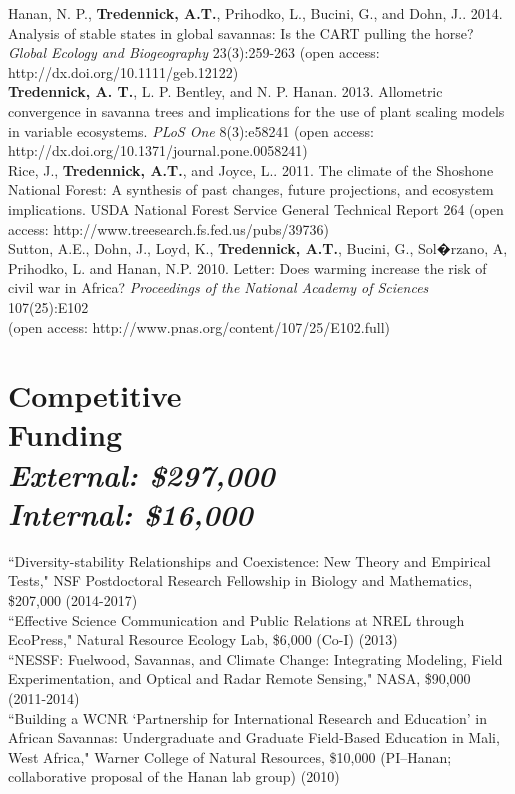 \documentclass[margin,line]{resume}
\begin{document}
\begin{resume}
	Hanan, N. P., \textbf{Tredennick, A.T.}, Prihodko, L., Bucini, G., and Dohn, J.. 2014. Analysis of stable states in global savannas: Is the CART pulling the horse? 	\textsl{Global Ecology and Biogeography} 23(3):259-263 (open access: http://dx.doi.org/10.1111/geb.12122) \vspace{-6mm}\\%
	
	\textbf{Tredennick, A. T.}, L. P. Bentley, and N. P. Hanan. 2013. Allometric convergence in savanna trees and implications for the use of plant scaling models in 	variable ecosystems. \textsl{PLoS One} 8(3):e58241 (open access: http://dx.doi.org/10.1371/journal.pone.0058241)\vspace{-6mm}\\%
	
	Rice, J., \textbf{Tredennick, A.T.}, and Joyce, L.. 2011. The climate of the Shoshone National Forest: A synthesis of past changes, future projections, and 			ecosystem implications. USDA National Forest Service General Technical Report 264 (open access: http://www.treesearch.fs.fed.us/pubs/39736) \vspace{-6mm}\\%
	
	Sutton, A.E., Dohn, J., Loyd, K., \textbf{Tredennick, A.T.}, Bucini, G., Sol�rzano, A, Prihodko, L. and Hanan, N.P. 2010. Letter: Does warming increase the risk of civil war 	in Africa? \textsl{Proceedings of the National Academy of Sciences} 107(25):E102 \\ (open access: http://www.pnas.org/content/107/25/E102.full) %
  
    \newpage
    \section{\mysidestyle Competitive\\Funding\\\textsl{\footnotesize External: \$297,000}\\\textsl{\footnotesize Internal: \$16,000}}
    ``Diversity-stability Relationships and Coexistence: New Theory and Empirical Tests," NSF Postdoctoral Research Fellowship in Biology and Mathematics, \$207,000 (2014-2017)\vspace{2mm}\\%
    ``Effective Science Communication and Public Relations at NREL through EcoPress," Natural Resource Ecology Lab, \$6,000 (Co-I) (2013) \vspace{2mm}\\%
    ``NESSF: Fuelwood, Savannas, and Climate Change: Integrating Modeling, Field Experimentation, and Optical and Radar Remote Sensing," NASA, \$90,000 (2011-2014) \vspace{2mm}\\%
    ``Building a WCNR `Partnership for International Research and Education' in African Savannas: Undergraduate and Graduate Field-Based Education in Mali, West Africa," Warner College of Natural Resources, \$10,000 (PI--Hanan; collaborative proposal of the Hanan lab group) (2010)%
    

\end{resume}
\end{document}
